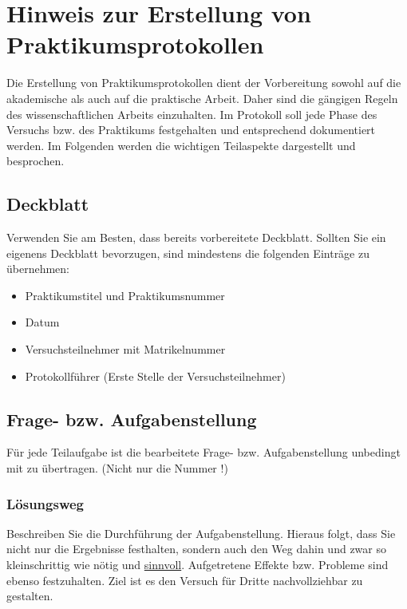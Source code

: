 \newcommand{\env}[1]{\texttt{#1}}
\newcommand{\command}[1]{\texttt{#1}}
\newcommand{\package}[1]{\texttt{\itshape#1}}
\newcommand{\engl}[1]{(engl: \textit{#1})\xspace}
\newpage

\section*{\LARGE Hinweis zur Erstellung von Praktikumsprotokollen} 
Die Erstellung von Praktikumsprotokollen dient der Vorbereitung sowohl auf die akademische als auch auf die praktische Arbeit. Daher sind die gängigen Regeln des wissenschaftlichen Arbeits einzuhalten. Im Protokoll soll jede Phase des Versuchs bzw. des Praktikums festgehalten und entsprechend dokumentiert werden. Im Folgenden werden die wichtigen Teilaspekte dargestellt und besprochen.

\subsection*{Deckblatt}

Verwenden Sie am Besten, dass bereits vorbereitete Deckblatt. Sollten Sie ein eigenens Deckblatt bevorzugen, sind mindestens die folgenden Einträge zu übernehmen:

\begin{itemize}
	\item Praktikumstitel und Praktikumsnummer
	\item Datum
	\item Versuchsteilnehmer mit Matrikelnummer
	\item Protokollführer (Erste Stelle der Versuchsteilnehmer)
\end{itemize}

\subsection*{Frage- bzw. Aufgabenstellung}
Für jede Teilaufgabe ist die bearbeitete Frage- bzw. Aufgabenstellung unbedingt mit zu übertragen. (Nicht nur die Nummer !)

\subsubsection{Lösungsweg}
Beschreiben Sie die Durchführung der Aufgabenstellung. Hieraus folgt, dass Sie nicht nur die Ergebnisse festhalten, sondern auch den Weg dahin und zwar so kleinschrittig wie nötig und \underline{sinnvoll}. Aufgetretene Effekte bzw. Probleme sind ebenso festzuhalten. Ziel ist es den Versuch für Dritte nachvollziehbar zu gestalten.

